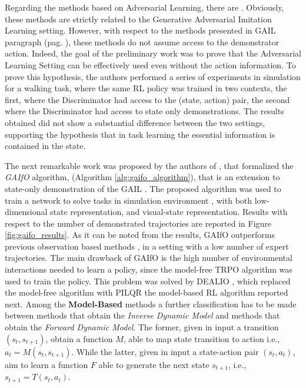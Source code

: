 \newline Regarding the methods based on Adversarial Learning, there are \cite{merel2017learning,torabi2018gaifo}. Obviously, these methods are strictly related to the Generative Adversarial Imitation Learning setting. However, with respect to the methods presented in GAIL paragraph (pag. \pageref{para:gail}), these methods do not assume access to the demonstrator action. Indeed, the goal of the preliminary work \cite{merel2017learning} was to prove that the Adversarial Learning Setting can be effectively used even without the action information. To prove this hypothesis, the authors performed a series of experiments in simulation for a walking task, where the same RL policy was trained in two contexts, the first, where the Discriminator had access to the (state, action) pair, the second where the Discriminator had access to state only demonstrations. The results obtained did not show a substantial difference between the two settings, supporting the hypothesis that in task learning the essential information is contained in the state.

\newline The next remarkable work was proposed by the authors of \cite{torabi2018gaifo}, that formalized the \textit{GAIfO} algorithm, (Algorithm \ref{alg:gaifo_algorithm}), that is an extension to state-only demonstration of the GAIL \cite{ho2016gail}. The proposed algorithm was used to train a network to solve tasks in simulation environment \cite{brockman2016openai}, with both low-dimensional state representation, and visual-state representation. Results with respect to the number of demonstrated trajectories are reported in Figure \ref{fig:gaifo_results}.
As it can be noted from the results, GAIfO outperforms previous observation based methods \cite{sermanet2018time_contrastive,torabi2018bco}, in a setting with a low number of expert trajectories. The main drawback of GAIfO is the high number of environmental interactions needed to learn a policy, since the model-free TRPO \cite{schulman2015trpo} algorithm was used to train the policy. This problem was solved by DEALIO \cite{torabi2021dealio}, which replaced the model-free algorithm with PILQR \cite{chebotar2017pilqr} the model-based RL algorithm reported next. 
\noindent Among the \textbf{Model-Based} methods a further classification has to be made between methods that obtain the \textit{Inverse Dynamic Model} and methods that obtain the \textit{Forward Dynamic Model}. The former, given in input a transition $(s_{t}, s_{t+1})$, obtain a function $M$, able to map state transition to action i.e., $a_{t} = M(s_{t}, s_{t+1})$. While the latter, given in input a state-action pair $(s_{t}, a_{t})$, aim to learn a function $F$ able to generate the next state $s_{t+1}$, i.e., $s_{t+1} = T(s_{t}, a_{t})$.
